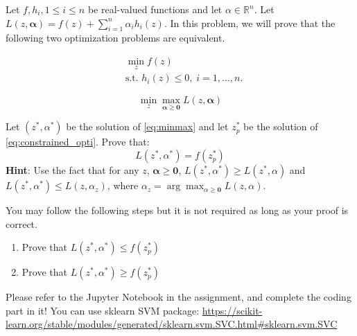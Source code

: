 \documentclass[11pt]{article}
\newenvironment{problem}[2][Problem]{\begin{trivlist}
\item[\hskip \labelsep {\bfseries #1}\hskip \labelsep {\bfseries #2.}]}{\end{trivlist}}
\begin{document}
\begin{problem}{3. (10 points)}
Let $f, h_i, 1\leq i\leq n$ be real-valued functions and let $\alpha \in \mathbb{R}^n$. Let $L(z,\bm{\alpha}) = f(z) + \sum\limits_{i=1}^{n} \alpha_i h_i(z)$. In this problem, we will prove that the following two optimization problems are equivalent.

\begin{minipage}{0.45\textwidth}
\begin{equation}\label{eq:constrained_opti}
\begin{aligned}
& \min_z f(z) \\
& \text{s.t. } h_i(z) \leq 0, \; i = 1, \ldots, n.
\end{aligned}
\end{equation} 
\end{minipage}%
\hfill
\begin{minipage}{0.45\textwidth}
\begin{equation}\label{eq:minmax}
\min_z \max_{\bm{\alpha} \geq \bm{0}} L(z,\bm{\alpha})
\end{equation}
\end{minipage}

Let $(z^*,\alpha^*)$ be the solution of \eqref{eq:minmax} and let $z_p^*$ be the solution of \eqref{eq:constrained_opti}.  Prove that:
	$$L(z^*, \alpha^*)  = f(z_p^*)$$
\textbf{Hint}: Use the fact that for any $z$, $\bm{\alpha} \geq \bm{0}$,  $L(z^*,\alpha^*) \geq L(z^*,\alpha)$ and $L(z^*, \alpha^*) \leq L(z,\alpha_z)$, where $\alpha_z = \arg \max_{\alpha \geq \bm{0}} L(z,\alpha)$.

You may follow the following steps but it is not required as long as your proof is correct.
\begin{enumerate}
\item Prove that $L(z^*, \alpha^*) \leq f(z_p^*)$
\item Prove that $L(z^*, \alpha^*) \geq f(z_p^*)$
\end{enumerate}
\end{problem}


\begin{problem}{4 (25 points) SVM Classification}
	Please refer to the Jupyter Notebook in the assignment, and complete the coding part in it!
	You can use sklearn SVM package: \url{https://scikit-learn.org/stable/modules/generated/sklearn.svm.SVC.html#sklearn.svm.SVC}
\end{problem}
\end{document}
